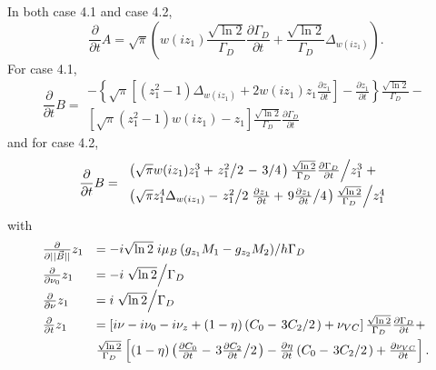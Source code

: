 In both case 4.1 and case 4.2,
\begin{equation}
 \frac{\partial}{\partial t} A = \sqrt{\pi} \left(w(iz_1)\frac{\sqrt{\ln 2}}{\Gamma_D}\frac{\partial \Gamma_D}{\partial t} + \frac{\sqrt{\ln 2}}{\Gamma_D}\Delta_{w(iz_1)}\right).
\end{equation}
For case 4.1,
\begin{equation}
\frac{\partial}{\partial t} B =
\begin{array}{l}
 -\left\{\sqrt{\pi} \left[\left(z_1^2 - 1\right) \Delta_{w(iz_1)} + 2 w(iz_1) z_1 \frac{\partial z_1}{\partial t}\right] - \frac{\partial z_1}{\partial t}\right\}
                  \frac{\sqrt{\ln 2}}{\Gamma_D} - \\[5pt]
              \left[\sqrt{\pi} \left(z_1^2 - 1\right) w(iz_1) - z_1\right] \frac{\sqrt{\ln 2}}{\Gamma_D}\frac{\partial \Gamma_D}{\partial t}
\end{array}
\end{equation}
and for case 4.2,
\begin{equation}
\frac{\partial}{\partial t} B =
\begin{array}{l}
\left.{\left(\sqrt{\pi} w(iz_1) z_1^3 + \left.z_1^2\middle/2\right. - \left.3\middle/4\right.\right) \frac{\sqrt{\ln 2}}{\Gamma_D}\frac{\partial \Gamma_D}{\partial t}}\middle/{z_1^3}\right. + \\[5pt]
\left.{\left(\sqrt{\pi} z_1^4 \Delta_{w(iz_1)} - \left.z_1^2\middle/2\right. \frac{\partial z_1}{\partial t} + \left.9\frac{\partial z_1}{\partial t}\middle/4\right.\right)\frac{\sqrt{\ln 2}}{\Gamma_D}}\middle/{z_1^4}\right.
\end{array}
\end{equation}
with
\begin{equation}
 \begin{array}{ll}
  \frac{\partial}{\partial ||\vec{B}||}z_1 &= -i \sqrt{\ln 2} \left.i\mu_B\left(g_{z_1}M_1 - g_{z_2}M_2\right)\middle/h\Gamma_D\right.  \\[5pt]
  \frac{\partial}{\partial \nu_0} z_1 &= -i\left.\sqrt{\ln2}\middle/\Gamma_D\right. \\[5pt]
  \frac{\partial}{\partial \nu} z_1 &= i\left.\sqrt{\ln 2}\middle/\Gamma_D\right. \\[5pt]
  \frac{\partial}{\partial t} z_1 &= \left[i\nu - i\nu_0 - i\nu_z + (1-\eta)\left(C_0 - \left.3C_2\middle/2\right.\right) + \nu_{VC}\right] \frac{\sqrt{\ln 2}}{\Gamma_D}\frac{\partial \Gamma_D}{\partial t} + \\[5pt]&
 \frac{\sqrt{\ln 2}}{\Gamma_D} \left[(1-\eta)\left(\frac{\partial C_0}{\partial t} - \left.3\frac{\partial C_2}{\partial t}\middle/2\right.\right)-\frac{\partial\eta}{\partial t}\left(C_0 - \left.3C_2\middle/2\right.\right) + \frac{\partial\nu_{VC}}{\partial t}\right].
 \end{array}
\end{equation}

